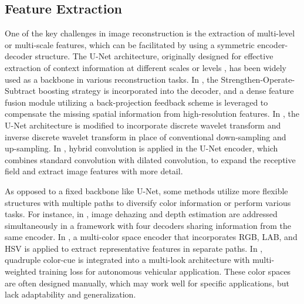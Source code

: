 \documentclass[lettersize,journal]{IEEEtran}
\begin{document}
\subsection{Feature Extraction}
\label{subsec:2.1}
One of the key challenges in image reconstruction is the extraction of multi-level or multi-scale features, which can be facilitated by using a symmetric encoder-decoder structure. The U-Net architecture, originally designed for effective extraction of context information at different scales or levels \cite{ronneberger2015u}, has been widely used as a backbone in various reconstruction tasks. In \cite{dong2020multi}, the Strengthen-Operate-Subtract boosting strategy is incorporated into the decoder, and a dense feature fusion module utilizing a back-projection feedback scheme is leveraged to compensate the missing spatial information from high-resolution features. In \cite{yang2019wavelet}, the U-Net architecture is modified to incorporate discrete wavelet transform and inverse discrete wavelet transform in place of conventional down-sampling and up-sampling. In \cite{feng2021urnet}, hybrid convolution is applied in the U-Net encoder, which combines standard convolution with dilated convolution, to expand the receptive field and extract image features with more detail.

As opposed to a fixed backbone like U-Net, some methods utilize more flexible structures with multiple paths to diversify color information or perform various tasks. For instance, in \cite{lee2020cnn}, image dehazing and depth estimation are addressed simultaneously in a framework with four decoders sharing information from the same encoder. In \cite{li2021underwater}, a multi-color space encoder that incorporates RGB, LAB, and HSV is applied to extract representative features in separate paths. In \cite{mehra2020reviewnet}, quadruple color-cue is integrated into a multi-look architecture with multi-weighted training loss for autonomous vehicular application. These color spaces are often designed manually, which may work well for specific applications, but lack adaptability and generalization.

\end{document}
